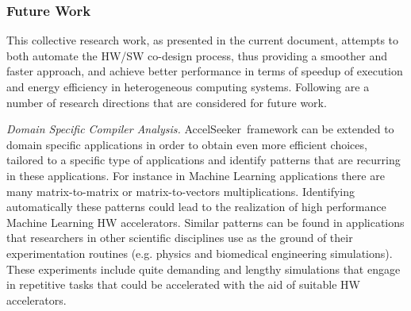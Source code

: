 \documentclass[]{usiinfthesis}
\newcommand{\aseeker}{{AccelSeeker}}
\newcommand{\rseeker}{{RegionSeeker}}
\begin{document}



\subsubsection{Future Work}


This collective research work, as presented in the current document, attempts to both automate the HW/SW 
co-design process, thus providing a smoother and faster approach, and achieve better performance in 
terms of speedup of execution and energy efficiency in heterogeneous computing systems. Following 
are a number of research directions that are considered for future work.\par

\emph{Domain Specific Compiler Analysis.}  \aseeker\ framework can be extended to domain specific applications 
in order to obtain even more efficient choices, tailored to a specific type of applications and identify patterns 
that are recurring in these applications.
For instance in Machine Learning applications there are many matrix-to-matrix or matrix-to-vectors multiplications.
Identifying automatically these patterns could lead to the realization of high performance Machine Learning
HW accelerators. Similar patterns can be found in applications that researchers in other scientific disciplines
use as the ground of their experimentation routines (e.g. physics and biomedical engineering simulations). These experiments include quite demanding and lengthy 
simulations that engage in repetitive tasks that could be accelerated with the aid of suitable HW 
accelerators.\par
\end{document}
